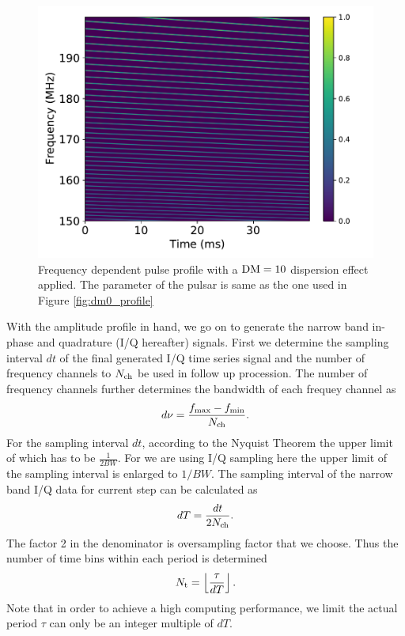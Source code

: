 \documentclass[fleqn,usenatbib]{mnras}
\begin{document}
 \begin{figure}
    \centering
    \includegraphics[width=0.9\columnwidth]{dm10_profile.pdf}
    \caption{Frequency dependent pulse profile with a $\rm DM=10$ dispersion effect applied. The parameter of the pulsar
    is same as the one used in Figure \ref{fig:dm0_profile}}
    \label{fig:dm10_profile}
 \end{figure}
 
With the amplitude profile in hand, we go on to generate the narrow band in-phase and quadrature (I/Q hereafter) signals.
First we determine the sampling interval $dt$ of the final generated I/Q time series signal and the number of frequency channels to $N_{\rm ch}$ be used in follow up procession.
The number of frequency channels further determines the bandwidth of each frequey channel as
\begin{gather}
    d\nu=\frac{f_{\max}-f_{\min}}{N_{\rm ch}}.
\end{gather}
For the sampling interval $dt$, according to the Nyquist Theorem the upper limit of which has to be $\frac{1}{2BW}$. 
For we are using I/Q sampling here the upper limit of the sampling interval is enlarged to $1/BW$.
The sampling interval of the narrow band I/Q data for current step can be calculated as
\begin{gather}
 dT=\frac{dt}{2N_{\rm ch}}.
\end{gather}
The factor 2 in the denominator is oversampling factor that we choose.
Thus the number of time bins within each period is determined 
\begin{gather}
 N_{\rm t}=\left\lfloor\frac{\tau}{dT}\right\rfloor.
\end{gather}
Note that in order to achieve a high computing performance, we limit the actual period $\tau$ can only be an integer multiple of $dT$.
\end{document}
